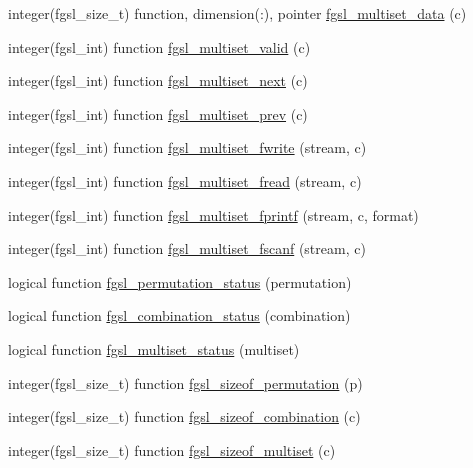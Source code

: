 \begin{DoxyCompactItemize}
\item 
integer(fgsl\+\_\+size\+\_\+t) function, dimension(\+:), pointer \hyperlink{permutation_8finc_af687c5f061870efcc8d104654d26b88e}{fgsl\+\_\+multiset\+\_\+data} (c)
\item 
integer(fgsl\+\_\+int) function \hyperlink{permutation_8finc_acde8e9dc3c43e69cae5b2679a4e3156e}{fgsl\+\_\+multiset\+\_\+valid} (c)
\item 
integer(fgsl\+\_\+int) function \hyperlink{permutation_8finc_a8448ce578712a0b1e42918d448856052}{fgsl\+\_\+multiset\+\_\+next} (c)
\item 
integer(fgsl\+\_\+int) function \hyperlink{permutation_8finc_a00e824e9ee9cb15a5939c1f7dec2c5e1}{fgsl\+\_\+multiset\+\_\+prev} (c)
\item 
integer(fgsl\+\_\+int) function \hyperlink{permutation_8finc_ad5694529ae97ed0a85ae153737232382}{fgsl\+\_\+multiset\+\_\+fwrite} (stream, c)
\item 
integer(fgsl\+\_\+int) function \hyperlink{permutation_8finc_acf2bf65c017f6537e1751bcd12b43774}{fgsl\+\_\+multiset\+\_\+fread} (stream, c)
\item 
integer(fgsl\+\_\+int) function \hyperlink{permutation_8finc_aa0d4a4609f7410cb0aba15ff56ae5fa4}{fgsl\+\_\+multiset\+\_\+fprintf} (stream, c, format)
\item 
integer(fgsl\+\_\+int) function \hyperlink{permutation_8finc_a9e05fb001350d8e3667f3fbaee59a0ce}{fgsl\+\_\+multiset\+\_\+fscanf} (stream, c)
\item 
logical function \hyperlink{permutation_8finc_a59b2c2f3d7df483019e0a8f270ad6fb5}{fgsl\+\_\+permutation\+\_\+status} (permutation)
\item 
logical function \hyperlink{permutation_8finc_a579b1fdf03f937579abf673f2a436043}{fgsl\+\_\+combination\+\_\+status} (combination)
\item 
logical function \hyperlink{permutation_8finc_ab7dfd6ba20374a426f2b813cf8bf63ec}{fgsl\+\_\+multiset\+\_\+status} (multiset)
\item 
integer(fgsl\+\_\+size\+\_\+t) function \hyperlink{permutation_8finc_aa3a991b00a25f168c7ff9f0df9e327c9}{fgsl\+\_\+sizeof\+\_\+permutation} (p)
\item 
integer(fgsl\+\_\+size\+\_\+t) function \hyperlink{permutation_8finc_aee397495d24c58890649db47f9a17ebf}{fgsl\+\_\+sizeof\+\_\+combination} (c)
\item 
integer(fgsl\+\_\+size\+\_\+t) function \hyperlink{permutation_8finc_a73a0b5bb42cd2a204bbda54a8aa2869d}{fgsl\+\_\+sizeof\+\_\+multiset} (c)
\end{DoxyCompactItemize}


